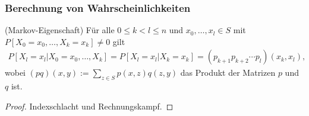 \subsubsection{Berechnung von Wahrscheinlichkeiten}

\begin{satz} (Markov-Eigenschaft) F\"ur alle $0 \leq k < l \leq n$ und $x_0,
\ldots, x_l \in S$ mit $P[X_0 = x_0, \ldots , X_k = x_k ] \neq 0$ gilt
\begin{eqnarray}
P[X_l = x_l | X_0=x_0, \ldots, X_k] = P[X_l = x_l | X_k = x_k] =
(p_{k+1}p_{k+2} \cdots p_l)(x_k,x_l), \nonumber
\end{eqnarray}
wobei $(pq)(x,y):=\sum_{z\in S} p(x,z) q(z,y)$ das Produkt der Matrizen $p$ und
$q$ ist.
\end{satz}
\begin{proof} Indexschlacht und Rechnungskampf.
\end{proof}
